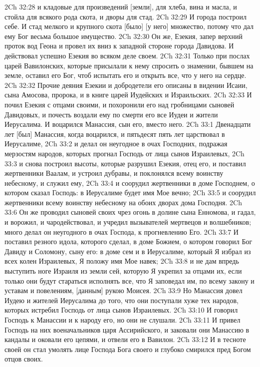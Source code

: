 2Ch 32:28  и кладовые для произведений [земли], для хлеба, вина и масла, и стойла для всякого рода скота, и дворы для стад.
2Ch 32:29  И города построил себе. И стад мелкого и крупного скота [было] [у него] множество, потому что дал ему Бог весьма большое имущество.
2Ch 32:30  Он же, Езекия, запер верхний проток вод Геона и провел их вниз к западной стороне города Давидова. И действовал успешно Езекия во всяком деле своем.
2Ch 32:31  Только при послах царей Вавилонских, которые присылали к нему спросить о знамении, бывшем на земле, оставил его Бог, чтоб испытать его и открыть все, что у него на сердце.
2Ch 32:32  Прочие деяния Езекии и добродетели его описаны в видении Исаии, сына Амосова, пророка, и в книге царей Иудейских и Израильских.
2Ch 32:33  И почил Езекия с отцами своими, и похоронили его над гробницами сыновей Давидовых, и почесть воздали ему по смерти его все Иудеи и жители Иерусалима. И воцарился Манассия, сын его, вместо него.
2Ch 33:1  Двенадцати лет [был] Манассия, когда воцарился, и пятьдесят пять лет царствовал в Иерусалиме,
2Ch 33:2  и делал он неугодное в очах Господних, подражая мерзостям народов, которых прогнал Господь от лица сынов Израилевых,
2Ch 33:3  и снова построил высоты, которые разрушил Езекия, отец его, и поставил жертвенники Ваалам, и устроил дубравы, и поклонялся всему воинству небесному, и служил ему,
2Ch 33:4  и соорудил жертвенники в доме Господнем, о котором сказал Господь: в Иерусалиме будет имя Мое вечно;
2Ch 33:5  и соорудил жертвенники всему воинству небесному на обоих дворах дома Господня.
2Ch 33:6  Он же проводил сыновей своих чрез огонь в долине сына Енномова, и гадал, и ворожил, и чародействовал, и учредил вызывателей мертвецов и волшебников; много делал он неугодного в очах Господа, к прогневлению Его.
2Ch 33:7  И поставил резного идола, которого сделал, в доме Божием, о котором говорил Бог Давиду и Соломону, сыну его: в доме сем и в Иерусалиме, который Я избрал из всех колен Израилевых, Я положу имя Мое навек;
2Ch 33:8  и не дам впредь выступить ноге Израиля из земли сей, которую Я укрепил за отцами их, если только они будут стараться исполнять все, что Я заповедал им, по всему закону и уставам и повелениям, [данным] рукою Моисея.
2Ch 33:9  Но Манассия довел Иудею и жителей Иерусалима до того, что они поступали хуже тех народов, которых истребил Господь от лица сынов Израилевых.
2Ch 33:10  И говорил Господь к Манассии и к народу его, но они не слушали.
2Ch 33:11  И привел Господь на них военачальников царя Ассирийского, и заковали они Манассию в кандалы и оковали его цепями, и отвели его в Вавилон.
2Ch 33:12  И в тесноте своей он стал умолять лице Господа Бога своего и глубоко смирился пред Богом отцов своих.
